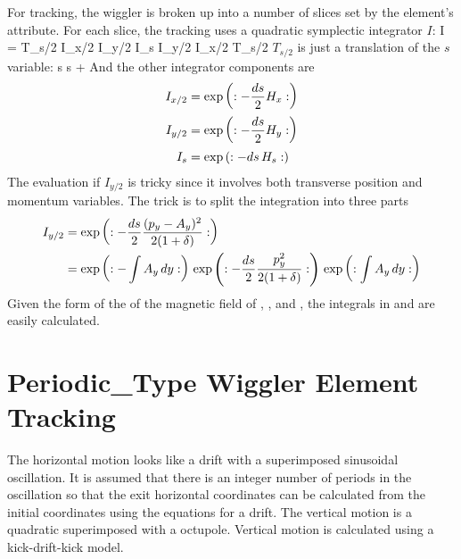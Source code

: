 For tracking, the wiggler is broken up into a number of slices set by
the element's  attribute. For each slice, the tracking
uses a quadratic symplectic integrator $I$:
\Begineq
  I = T_{s/2} \; I_{x/2} \; I_{y/2} \; I_s \; I_{y/2} \; I_{x/2} \; T_{s/2}
\Endeq
$T_{s/2}$ is just a translation of the $s$ variable:
\Begineq
  s \rightarrow s + 
\Endeq
And the other integrator components are
\begin{align}
  I_{x/2} &= \exp \left( : -\frac{ds}{2} H_x : \right) \nonumber \\
  I_{y/2} &= \exp \left( : -\frac{ds}{2} H_y : \right) \\
  I_{s}   &= \exp \left( : -ds \, H_s : \right) \nonumber
\end{align}
The evaluation if $I_{y/2}$ is tricky since it involves both transverse
position and momentum variables. The trick is to split the integration into three parts
\begin{align}
  I_{y/2} &= \exp \left( : -\frac{ds}{2} \frac{(p_y - A_y)^2}{2 (1 + \delta)} : \right) \nonumber \\
  &= \exp \left( : -\int A_y \, dy : \right) \,
     \exp \left( : -\frac{ds}{2} \frac{p_y^2}{2 (1 + \delta)} : \right) \,
     \exp \left( : \int A_y \, dy : \right)
  \label{ids2}
\end{align}
Given the form of the of the magnetic field of , , and
, the integrals in  and  are easily calculated.

\section{Periodic\_Type Wiggler Element Tracking}
\label{s:wiggler.periodic.std}

The horizontal motion looks like a drift with a superimposed
sinusoidal oscillation. It is assumed that there is an integer number
of periods in the oscillation so that the exit horizontal coordinates
can be calculated from the initial coordinates using the equations for
a drift. The vertical motion is a quadratic superimposed with a
octupole. Vertical motion is calculated using a kick-drift-kick model.

